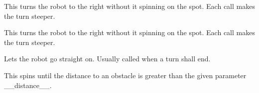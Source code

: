 \documentclass[letterpaper,10pt,english]{sphinxmanual}
\begin{document}
\begin{fulllineitems}
\begin{fulllineitems}
\end{fulllineitems}


\begin{fulllineitems}
\label{\detokenize{autoapi/robotlibrary/robot/index:robotlibrary.robot.Robot.turn_right}}
\pysigstartsignatures
{}
\pysigstopsignatures
\sphinxAtStartPar
This turns the robot to the right without it spinning on the spot. Each call makes the turn steeper.

\end{fulllineitems}


\begin{fulllineitems}
\label{\detokenize{autoapi/robotlibrary/robot/index:robotlibrary.robot.Robot.turn_left}}
\pysigstartsignatures
{}
\pysigstopsignatures
\sphinxAtStartPar
This turns the robot to the right without it spinning on the spot. Each call makes the turn steeper.

\end{fulllineitems}


\begin{fulllineitems}
\label{\detokenize{autoapi/robotlibrary/robot/index:robotlibrary.robot.Robot.go_straight}}
\pysigstartsignatures
{}
\pysigstopsignatures
\sphinxAtStartPar
Lets the robot go straight on. Usually called when a turn shall end.

\end{fulllineitems}


\begin{fulllineitems}
\label{\detokenize{autoapi/robotlibrary/robot/index:robotlibrary.robot.Robot.spin_before_obstacle}}
\pysigstartsignatures
{}
\pysigstopsignatures
\sphinxAtStartPar
This spins until the distance to an obstacle is greater than the given parameter \_\_distance\_\_.


\end{fulllineitems}
\end{fulllineitems}
\end{document}
